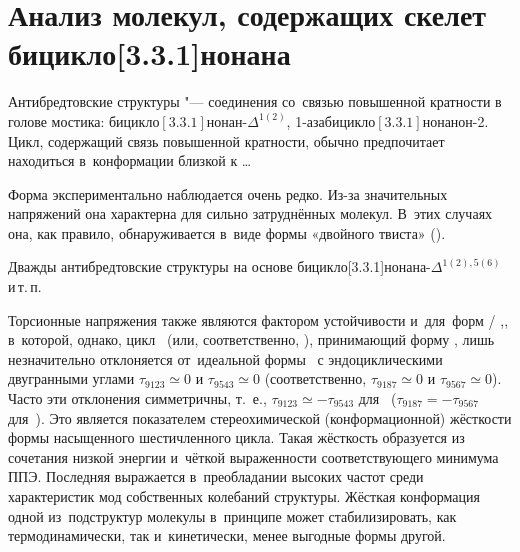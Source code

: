 \section{Анализ молекул, содержащих скелет бицикло[3.3.1]нонана}

Антибредтовские структуры "--- соединения со~связью повышенной кратности в
голове мостика: бицикло$[3.3.1]$нонан-$\Delta^{1(2)}$,
1-азабицикло$[3.3.1]$нонанон-2. Цикл, содержащий связь повышенной кратности,
обычно предпочитает находиться в~конформации близкой к \dots

\begin{center}
   \quad
   \quad
\end{center}


Форма \BB{} экспериментально наблюдается очень редко. Из-за значительных напряжений она характерна для сильно затруднённых молекул. В~этих случаях она, как правило, обнаруживается в~виде формы «двойного твиста» (\TT{}).

Дважды антибредтовские структуры на основе бицикло[3.3.1]нонана-$\Delta^{1(2),5(6)}$  и\,т.\,п.

\begin{center}
   \quad
   \quad {}
\end{center}

Торсионные напряжения также являются фактором устойчивости и~для~форм \BC{} / \CB{},, в~которой, однако, цикл~\CycleFirst{} (или, соответственно, \CycleSecond{}), принимающий форму , лишь незначительно отклоняется от~идеальной формы ~с эндоциклическими двугранными углами $\tau_{9123}\simeq 0$ и $\tau_{9543}\simeq 0$ (соответственно, $\tau_{9187}\simeq 0$ и $\tau_{9567}\simeq 0$). Часто эти отклонения симметричны, т.~е., $\tau_{9123} \simeq - \tau_{9543}$ для~\BC{} ($\tau_{9187} = -\tau_{9567}$ для~\CB{}). Это является показателем стереохимической (конформационной) жёсткости формы  насыщенного шестичленного цикла. Такая жёсткость образуется из сочетания низкой энергии и~чёткой выраженности соответствующего минимума ППЭ. Последняя выражается в~преобладании высоких частот среди характеристик мод собственных колебаний структуры. Жёсткая конформация одной из~подструктур молекулы в~принципе может стабилизировать, как термодинамически, так и~кинетически, менее выгодные формы другой.

